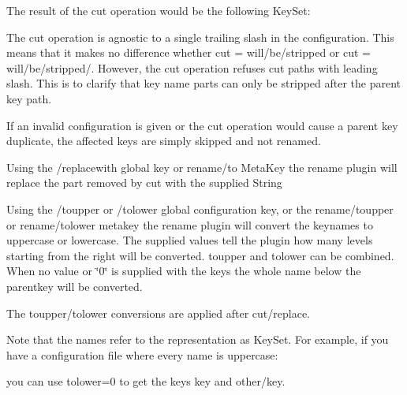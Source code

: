 The result of the cut operation would be the following Key\+Set\+:


\begin{DoxyCode}{0}
\end{DoxyCode}


The cut operation is agnostic to a single trailing slash in the configuration. This means that it makes no difference whether {\ttfamily cut = will/be/stripped} or {\ttfamily cut = will/be/stripped/}. However, the cut operation refuses cut paths with leading slash. This is to clarify that key name parts can only be stripped after the parent key path.

If an invalid configuration is given or the cut operation would cause a parent key duplicate, the affected keys are simply skipped and not renamed.

Using the {\ttfamily /replacewith} global key or {\ttfamily rename/to} Meta\+Key the rename plugin will replace the part removed by {\ttfamily cut} with the supplied String

Using the {\ttfamily /toupper} or {\ttfamily /tolower} global configuration key, or the {\ttfamily rename/toupper} or {\ttfamily rename/tolower} metakey the rename plugin will convert the keynames to uppercase or lowercase. The supplied values tell the plugin how many levels starting from the right will be converted. {\ttfamily toupper} and {\ttfamily tolower} can be combined. When no value or \char`\"{}0\char`\"{} is supplied with the keys the whole name below the parentkey will be converted.

The toupper/tolower conversions are applied after cut/replace.

Note that the names refer to the representation as Key\+Set. For example, if you have a configuration file where every name is uppercase\+:


\begin{DoxyCode}{0}
\end{DoxyCode}


you can use {\ttfamily tolower=0} to get the keys {\ttfamily key} and {\ttfamily other/key}.


\begin{DoxyCode}{0}
\DoxyCodeLine{}
\DoxyCodeLine{}
\DoxyCodeLine{}
\end{DoxyCode}


